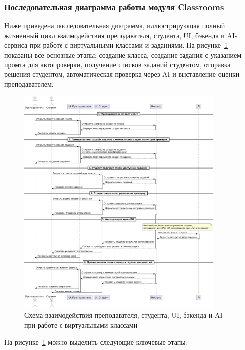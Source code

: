 \subsubsection{Последовательная диаграмма работы модуля Classrooms}
Ниже приведена последовательная диаграмма, иллюстрирующая полный жизненный цикл взаимодействия преподавателя, студента, UI, бэкенда и AI-сервиса при работе с виртуальными классами и заданиями. На рисунке~\ref{fig:classroom-flow} показаны все основные этапы: создание класса, создание задания с указанием промта для автопроверки, получение списков заданий студентом, отправка решения студентом, автоматическая проверка через AI и выставление оценки преподавателем.

\begin{figure}[H]
    \centering
    \includegraphics[width=0.9\textwidth]{static/diagrams/Classroom.png}
    \caption{Схема взаимодействия преподавателя, студента, UI, бэкенда и AI при работе с виртуальными классами}
    \label{fig:classroom-flow}
\end{figure}

На рисунке~\ref{fig:classroom-flow} можно выделить следующие ключевые этапы:

